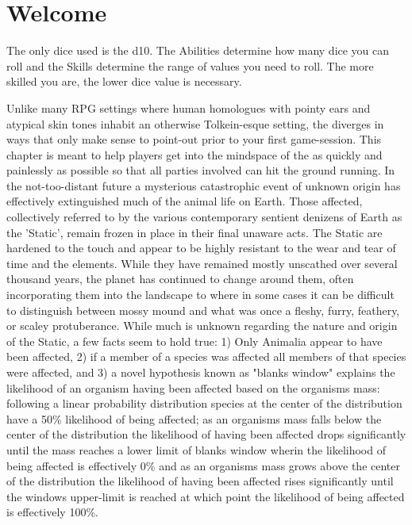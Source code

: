 \documentclass[twoside, 12pt, letterpaper]{report}\usepackage[]{graphicx}\usepackage[]{color}
\begin{document}
\part*{Welcome}
\begin{multicols*}{2}
The only dice used is the d10. The Abilities determine how many dice you can roll and the Skills determine the range of values you need to roll. The more skilled you are, the lower dice value is necessary.
\end{multicols*}
\begin{multicols*}{2}
Unlike many RPG settings where human homologues with pointy ears and atypical skin tones inhabit an otherwise Tolkein-esque setting, the \mw diverges in ways that only make sense to point-out prior to your first game-session. This chapter is meant to help players get into the mindspace of the \mw as quickly and painlessly as possible so that all parties involved can hit the ground running. 
In the not-too-distant future a mysterious catastrophic event of unknown origin has effectively extinguished much of the animal life on Earth. Those affected, collectively referred to by the various contemporary sentient denizens of Earth as the 'Static', remain frozen in place in their final unaware acts. The Static are hardened to the touch and appear to be highly resistant to the wear and tear of time and the elements. While they have remained mostly unscathed over several thousand years, the planet has continued to change around them, often incorporating them into the landscape to where in some cases it can be difficult to distinguish between mossy mound and what was once a fleshy, furry, feathery, or scaley protuberance.
While much is unknown regarding the nature and origin of the Static, a few facts seem to hold true: 1) Only Animalia appear to have been affected, 2) if a member of a species was affected all members of that species were affected, and 3) a novel hypothesis known as "blanks window" explains the likelihood of an organism having been affected based on the organisms mass: following a linear probability distribution species at the center of the distribution have a 50\% likelihood of being affected; as an organisms mass falls below the center of the distribution the likelihood of having been affected drops significantly until the mass reaches a lower limit of blanks window wherin the likelihood of being affected is effectively 0\% and as an organisms mass grows above the center of the distribution the likelihood of having been affected rises significantly until the windows upper-limit is reached at which point the likelihood of being affected is effectively 100\%.


\end{multicols*}
\end{document}
